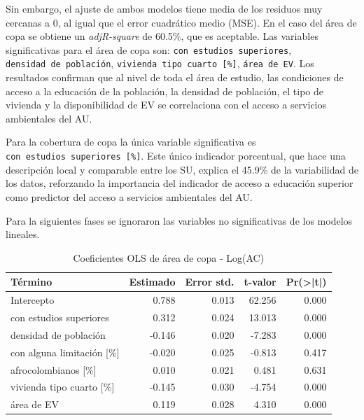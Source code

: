 \documentclass[12pt,a4paper,openany]{book}
\theoremstyle{definition}
\theoremstyle{definition}
\theoremstyle{definition}
\theoremstyle{remark}
\begin{document}
Sin embargo, el ajuste de ambos modelos tiene media de los residuos muy
cercanas a 0, al igual que el error cuadrático medio (MSE). En el caso
del área de copa se obtiene un \emph{adjR-square} de 60.5\%, que es
aceptable. Las variables significativas para el área de copa son:
\texttt{con\ estudios\ superiores}, \texttt{densidad\ de\ población},
\texttt{vivienda\ tipo\ cuarto\ {[}\%{]}}, \texttt{área\ de\ EV}. Los
resultados confirman que al nivel de toda el área de estudio, las
condiciones de acceso a la educación de la población, la densidad de
población, el tipo de vivienda y la disponibilidad de EV se correlaciona
con el acceso a servicios ambientales del AU.

Para la cobertura de copa la única variable significativa es
\texttt{con\ estudios\ superiores\ {[}\%{]}}. Este único indicador
porcentual, que hace una descripción local y comparable entre los SU,
explica el 45.9\% de la variabilidad de los datos, reforzando la
importancia del indicador de acceso a educación superior como predictor
del acceso a servicios ambientales del AU.

Para la siguientes fases se ignoraron las variables no significativas de
los modelos lineales.

\begin{table}[H]

\caption{\label{tab:coef-lm-copa}Coeficientes OLS de área de copa - Log(AC)}
\centering
\begin{tabular}{lrrrr}
\toprule
Término & Estimado & Error std. & t-valor & Pr(>|t|)\\
\midrule
Intercepto & 0.788 & 0.013 & 62.256 & 0.000\\
con estudios superiores & 0.312 & 0.024 & 13.013 & 0.000\\
densidad de población & -0.146 & 0.020 & -7.283 & 0.000\\
con alguna limitación [\%] & -0.020 & 0.025 & -0.813 & 0.417\\
afrocolombianos [\%] & 0.010 & 0.021 & 0.481 & 0.631\\
\addlinespace
vivienda tipo cuarto [\%] & -0.145 & 0.030 & -4.754 & 0.000\\
área de EV & 0.119 & 0.028 & 4.310 & 0.000\\
\bottomrule
\end{tabular}
\end{table}
\end{document}
